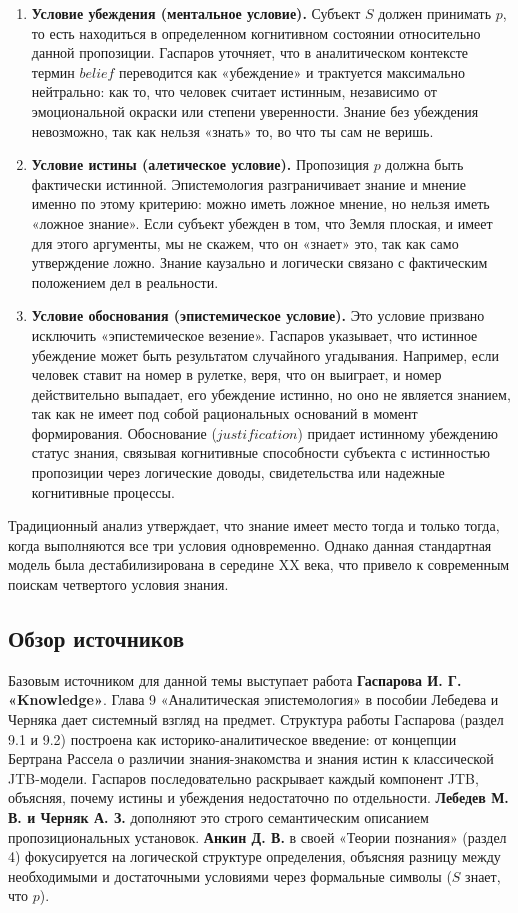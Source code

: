 \documentclass[a4paper,12pt]{article}
\begin{document}
\begin{enumerate}
\item \textbf{Условие убеждения (ментальное условие).} Субъект $S$ должен принимать $p$, то есть находиться в определенном когнитивном состоянии относительно данной пропозиции. Гаспаров уточняет, что в аналитическом контексте термин $belief$ переводится как «убеждение» и трактуется максимально нейтрально: как то, что человек считает истинным, независимо от эмоциональной окраски или степени уверенности. Знание без убеждения невозможно, так как нельзя «знать» то, во что ты сам не веришь.

\item \textbf{Условие истины (алетическое условие).} Пропозиция $p$ должна быть фактически истинной. Эпистемология разграничивает знание и мнение именно по этому критерию: можно иметь ложное мнение, но нельзя иметь «ложное знание». Если субъект убежден в том, что Земля плоская, и имеет для этого аргументы, мы не скажем, что он «знает» это, так как само утверждение ложно. Знание каузально и логически связано с фактическим положением дел в реальности.

\item \textbf{Условие обоснования (эпистемическое условие).} Это условие призвано исключить «эпистемическое везение». Гаспаров указывает, что истинное убеждение может быть результатом случайного угадывания. Например, если человек ставит на номер в рулетке, веря, что он выиграет, и номер действительно выпадает, его убеждение истинно, но оно не является знанием, так как не имеет под собой рациональных оснований в момент формирования. Обоснование ($justification$) придает истинному убеждению статус знания, связывая когнитивные способности субъекта с истинностью пропозиции через логические доводы, свидетельства или надежные когнитивные процессы.
\end{enumerate}

Традиционный анализ утверждает, что знание имеет место тогда и только тогда, когда выполняются все три условия одновременно. Однако данная стандартная модель была дестабилизирована в середине XX века, что привело к современным поискам четвертого условия знания.

\subsection{Обзор источников}

Базовым источником для данной темы выступает работа \textbf{Гаспарова И. Г. «Knowledge»}. Глава 9 «Аналитическая эпистемология» в пособии Лебедева и Черняка дает системный взгляд на предмет. Структура работы Гаспарова (раздел 9.1 и 9.2) построена как историко-аналитическое введение: от концепции Бертрана Рассела о различии знания-знакомства и знания истин к классической JTB-модели. Гаспаров последовательно раскрывает каждый компонент JTB, объясняя, почему истины и убеждения недостаточно по отдельности. \textbf{Лебедев М. В. и Черняк А. З.} дополняют это строго семантическим описанием пропозициональных установок. \textbf{Анкин Д. В.} в своей «Теории познания» (раздел 4) фокусируется на логической структуре определения, объясняя разницу между необходимыми и достаточными условиями через формальные символы ($S$ знает, что $p$).
\end{document}
